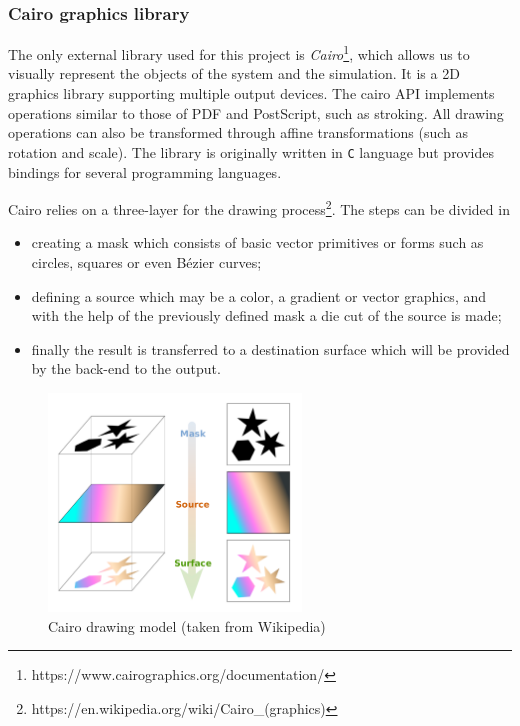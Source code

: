 \documentclass[]{usiinfbachelorproject}
\begin{document}
\subsubsection{Cairo graphics library}
The only external library used for this project is \textit{Cairo}\footnote{https://www.cairographics.org/documentation/}, which allows us to visually represent the 
objects of the system and the simulation. It is a 2D graphics library supporting multiple output devices. The cairo API implements operations 
similar to those of PDF and PostScript, such as stroking. All drawing operations can also be 
transformed through affine transformations (such as rotation and scale). The library is originally written in \texttt{C} language but provides bindings for several programming languages.

Cairo relies on a three-layer for the drawing process\footnote{https://en.wikipedia.org/wiki/Cairo\_(graphics)}. The steps can be divided in
\begin{itemize}
  \item creating a mask which consists of basic vector primitives or forms such as circles, squares or even 
  Bézier curves;
  \item defining a source which may be a color, a gradient or vector graphics, and with the help of the 
  previously defined mask a die cut of the source is made;
  \item finally the result is transferred to a destination surface which will be provided by the back-end to the output.
\end{itemize}

\begin{figure} [h]
    \centering
    \includegraphics[width=0.6\textwidth]{cairo_model.png}
    \caption{Cairo drawing model (taken from Wikipedia)}
    \label{fig:CairoModel}
\end{figure}
\end{document}
